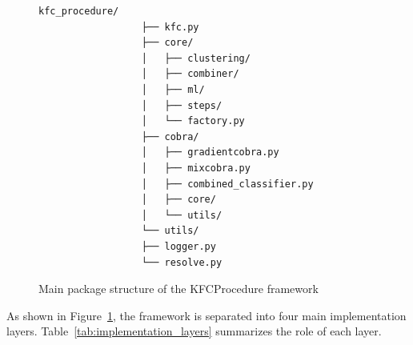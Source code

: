 \begin{figure}[H]
      \centering
      \begin{minipage}{0.85\textwidth}
            \begin{Verbatim}[fontsize=\footnotesize, baselinestretch=0.9]
                  kfc_procedure/
                  ├── kfc.py
                  ├── core/
                  │   ├── clustering/
                  │   ├── combiner/
                  │   ├── ml/
                  │   ├── steps/
                  │   └── factory.py
                  ├── cobra/
                  │   ├── gradientcobra.py
                  │   ├── mixcobra.py
                  │   ├── combined_classifier.py
                  │   ├── core/
                  │   └── utils/
                  └── utils/
                  ├── logger.py
                  └── resolve.py
            \end{Verbatim}
      \end{minipage}
      \caption{Main package structure of the KFCProcedure framework}
      \label{fig:kfcprocedure_package_structure}
\end{figure}

As shown in Figure~\ref{fig:kfcprocedure_package_structure}, the framework is separated into four main implementation layers. Table~\ref{tab:implementation_layers} summarizes the role of each layer.

